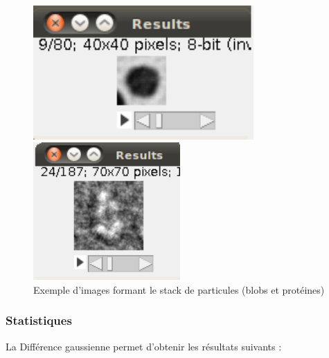 \begin{figure}[!ht]
\begin{center}
 \begin{minipage}{.450\linewidth}
  \includegraphics[width=0.75\textwidth]{cropblob.png}  
 \end{minipage} \hfill
\begin{minipage}{.450\linewidth}
  \includegraphics[width=0.5\textwidth]{cropprotDog.png}   
 \end{minipage} \hfill
\caption{Exemple d'images formant le stack de particules (blobs et protéines)}
\end{center}
\end{figure}

\subsubsection*{Statistiques}

La Différence gaussienne permet d'obtenir les résultats suivants :

